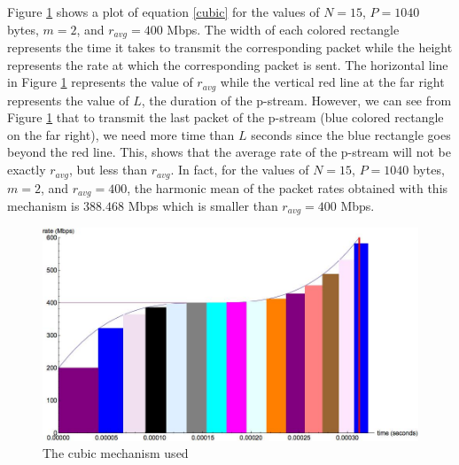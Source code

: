     Figure \ref{mechanism} shows a plot of 
    equation \eqref{cubic} for the values of $N = 15$, $P = 1040$ bytes, 
    $m = 2$, and $r_{avg} = 400$ Mbps. The width of each colored rectangle 
    represents the time it takes to transmit the corresponding packet while
    the height represents the rate at which the corresponding packet is sent. 
    The horizontal line in Figure \ref{mechanism} represents the value of 
    $r_{avg}$ while the vertical red line at the far right represents the 
    value of $L$, the duration of the p-stream. However, we can see from 
    Figure \ref{mechanism} that to transmit the last packet of the p-stream 
    (blue colored rectangle on the far right), we need more time than $L$ 
    seconds since the blue rectangle goes beyond the red line. This, shows 
    that the average rate of the p-stream will not be exactly $r_{avg}$, but 
    less than $r_{avg}$. In fact, for the values of $N = 15$, $P = 1040$ 
    bytes, $m = 2$, and $r_{avg} = 400$, the harmonic mean of the packet rates
    obtained with this mechanism is $388.468$ Mbps which is smaller than 
    $r_{avg} = 400$ Mbps.
    \begin{figure}[hbp]
      \includegraphics[scale=0.4]{img/cubic.jpg}
      \caption{The cubic mechanism used}
      \label{mechanism}
    \end{figure}

